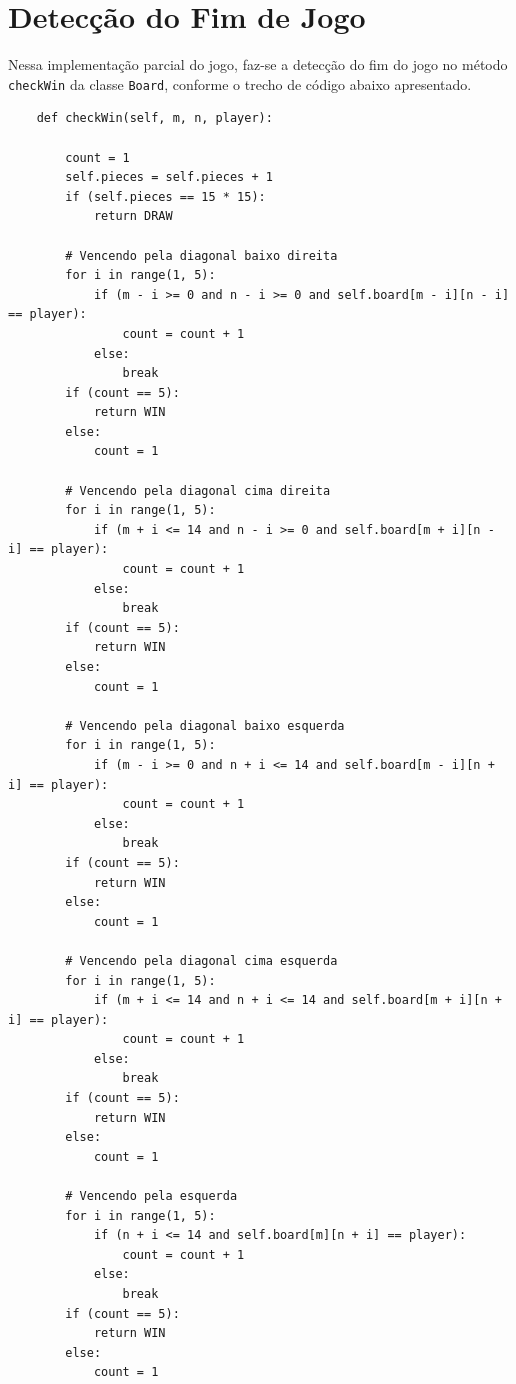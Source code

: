\documentclass[10pt,a4paper]{article}
\begin{document}

\section{Detecção do Fim de Jogo} \label{sec:fim_de_jogo}

Nessa implementação parcial do jogo, faz-se a detecção do fim do jogo no método \texttt{checkWin} da classe \texttt{Board}, conforme o trecho de código abaixo apresentado. 

\begin{verbatim}
    def checkWin(self, m, n, player):

        count = 1
        self.pieces = self.pieces + 1
        if (self.pieces == 15 * 15):
            return DRAW

        # Vencendo pela diagonal baixo direita
        for i in range(1, 5):
            if (m - i >= 0 and n - i >= 0 and self.board[m - i][n - i] == player):
                count = count + 1
            else:
                break
        if (count == 5):
            return WIN
        else:
            count = 1

        # Vencendo pela diagonal cima direita
        for i in range(1, 5):
            if (m + i <= 14 and n - i >= 0 and self.board[m + i][n - i] == player):
                count = count + 1
            else:
                break
        if (count == 5):
            return WIN
        else:
            count = 1

        # Vencendo pela diagonal baixo esquerda
        for i in range(1, 5):
            if (m - i >= 0 and n + i <= 14 and self.board[m - i][n + i] == player):
                count = count + 1
            else:
                break
        if (count == 5):
            return WIN
        else:
            count = 1

        # Vencendo pela diagonal cima esquerda
        for i in range(1, 5):
            if (m + i <= 14 and n + i <= 14 and self.board[m + i][n + i] == player):
                count = count + 1
            else:
                break
        if (count == 5):
            return WIN
        else:
            count = 1

        # Vencendo pela esquerda
        for i in range(1, 5):
            if (n + i <= 14 and self.board[m][n + i] == player):
                count = count + 1
            else:
                break
        if (count == 5):
            return WIN
        else:
            count = 1


\end{verbatim}
\end{document}
